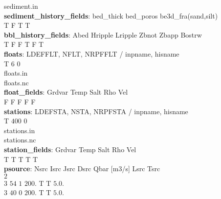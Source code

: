            sediment.in \\
\textbf{sediment\_history\_fields}: bed\_thick bed\_poros be3d\_fra(sand,silt) \\
                            T         F        T  T \\
\textbf{bbl\_history\_fields}: Abed Hripple Lripple Zbnot Zbapp Bostrw \\
                     T      F       F      T     F     T \\
\textbf{floats}: LDEFFLT, NFLT, NRPFFLT / inpname, hisname \\
           T       $6$      $0$ \\
                                   floats.in \\
                                   floats.nc \\
\textbf{float\_fields}:  Grdvar Temp Salt Rho Vel \\
                 F     F    F    F   F \\
\textbf{stations}: LDEFSTA, NSTA, NRPFSTA / inpname, hisname \\
             T      $400$      $0$ \\
                                    stations.in \\
                                    stations.nc \\
\textbf{station\_fields}:  Grdvar Temp Salt Rho Vel \\
                   T     T    T    T   T \\
\textbf{psource}:   Nsrc  Isrc  Jsrc  Dsrc  Qbar [m3/s]    Lsrc        Tsrc \\
            $2$ \\
            $3$    $54$     $1$    $200. $   T T      $5. 0.$ \\
            $3$    $40$     0    $200.$      T T      $5. 0.$ \\
 

